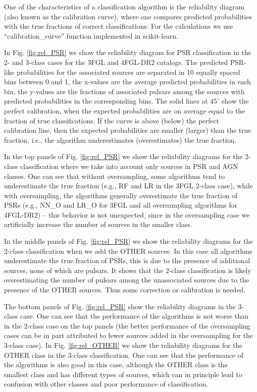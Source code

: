 \documentclass{aa}
\begin{document}
\begin{appendix}
One of the characteristics of a classification algorithm is the reliability diagram (also known as the calibration curve),
where one compares predicted probabilities with the true fractions of correct classifications.
For the calculations we use ``calibration\_curve'' function implemented in scikit-learn.

In Fig. \ref{fig:rel_PSR} we show the reliability diagram for PSR classification in the 2- and 3-class cases
for the 3FGL and 4FGL-DR2 catalogs.
The predicted PSR-like probabilities for the associated sources are separated in 10 equally spaced bins between 0 and 1, 
the x-values are the average predicted probabilities in each bin,
the y-values are the fractions of associated pulsars among the sources with predicted probabilities 
in the corresponding bins.
The solid lines at $45^\circ$ show the perfect calibration, when the expected probabilities are on average equal to the 
fraction of true classifications.
If the curve is above (below) the perfect calibration line, then the expected probabilities are smaller (larger) than the true fraction,
i.e., the algorithm underestimates (overestimates) the true fraction.


In the top panels of Fig. \ref{fig:rel_PSR} we show the reliability diagrams for the 2-class classification
where we take into account only sources in PSR and AGN classes.
One can see that without oversampling, some algorithms tend to underestimate the true fraction (e.g., RF and LR in the 3FGL 2-class case),
while with oversampling, the algorithms generally overestimate the true fraction of PSRs (e.g., NN\_O and LR\_O for 3FGL and all oversampling algorithms for 4FGL-DR2) -- this behavior is not unexpected, since in the oversampling case we artificially increase the number of sources in the smaller class.

In the middle panels of Fig. \ref{fig:rel_PSR} we show the reliability diagrams  for the 2-class classification
when we add the OTHER sources.
In this case all algorithms underestimate the true fraction of PSRs, this is due to the presence of additional sources,
none of which are pulsars.
It shows that the 2-class classification is likely overestimating the number of pulsars among the unassociated sources
due to the presence of the OTHER sources.
Thus some correction or calibration is needed.

The bottom panels of Fig. \ref{fig:rel_PSR} show the reliability diagrams in the 3-class case.
One can see that the performance of the algorithms is not worse than in the 2-class case on the top panels
(the better performance of the oversampling cases can be in part attributed to fewer sources added in the oversampling
for the 3-class case).
In Fig. \ref{fig:rel_OTHER} we show the reliability diagrams for the OTHER class in the 3-class classification.
One can see that the performance of the algorithms is also good in this case, although the OTHER class is the smallest class
and has different types of sources, which can in principle lead to confusion with other classes
and poor performance of classification.


\end{appendix}
\end{document}

